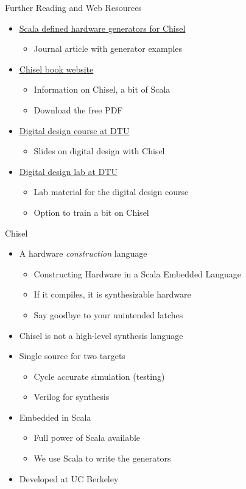 \begin{frame}[fragile]{Further Reading and Web Resources}
\begin{itemize}
\item \href{https://www.sciencedirect.com/science/article/pii/S014193312500050X}{Scala defined hardware generators for Chisel}
\begin{itemize}
\item Journal article with generator examples
\end{itemize}
\item \href{http://www.imm.dtu.dk/~masca/chisel-book.html}{Chisel book website}
\begin{itemize}
\item Information on Chisel, a bit of Scala
\item Download the free PDF
\end{itemize}
\item \href{http://www2.imm.dtu.dk/courses/02139/}{Digital design course at DTU}
\begin{itemize}
\item Slides on digital design with Chisel
\end{itemize}
\item \href{https://github.com/schoeberl/chisel-lab}{Digital design lab at DTU}
\begin{itemize}
\item Lab material for the digital design course
\item Option to train a bit on Chisel
\end{itemize}
\end{itemize}
\end{frame}



\begin{frame}[fragile]{Chisel}
\begin{itemize}
\item A hardware \emph{construction} language
\begin{itemize}
\item Constructing Hardware in a Scala Embedded Language
\item If it compiles, it is synthesizable hardware 
\item Say goodbye to your unintended latches
\end{itemize}
\item Chisel is not a high-level synthesis language
\item Single source for two targets
\begin{itemize}
\item Cycle accurate simulation (testing)
\item Verilog for synthesis
\end{itemize}
\item Embedded in Scala
\begin{itemize}
\item Full power of Scala available
\item We use Scala to write the generators
\end{itemize}
\item Developed at UC Berkeley
\end{itemize}
\end{frame}

